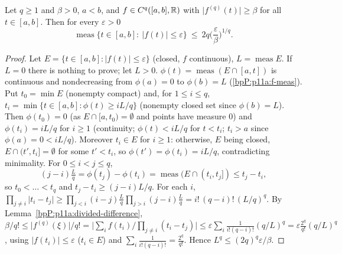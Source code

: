 \begin{lemma}\label{bpP:p11a:scalar-sublevel}
Let $q\ge1$ and $\beta>0$, $a<b$, and $f\in C^q([a,b],\mathbb{R})$ with $\lvert f^{(q)}(t)\rvert\ge\beta$ for all $t\in[a,b]$. Then for every $\varepsilon>0$
\[\operatorname{meas}\{t\in[a,b]:\ \lvert f(t)\rvert\le\varepsilon\}\ \le\ 2q\Big(\frac\varepsilon\beta\Big)^{1/q}.\]
\end{lemma}
\begin{proof}
Let $E=\{t\in[a,b]:\lvert f(t)\rvert\le\varepsilon\}$ (closed, $f$ continuous), $L=\operatorname{meas}E$. If $L=0$ there is nothing to prove; let $L>0$.
\label{stepP:p11a:ss-phi} $\phi(t)=\operatorname{meas}(E\cap[a,t])$ is continuous and nondecreasing from $\phi(a)=0$ to $\phi(b)=L$ (\ref{bpP:p11a:f-meas}).
\label{stepP:p11a:ss-nodes} Put $t_0=\min E$ (nonempty compact) and, for $1\le i\le q$, $t_i=\min\{t\in[a,b]:\phi(t)\ge iL/q\}$ (nonempty closed set since $\phi(b)=L$). Then $\phi(t_0)=0$ (as $E\cap[a,t_0)=\emptyset$ and points have measure $0$) and $\phi(t_i)=iL/q$ for $i\ge1$ (continuity; $\phi(t)<iL/q$ for $t<t_i$; $t_i>a$ since $\phi(a)=0<iL/q$). Moreover $t_i\in E$ for $i\ge1$: otherwise, $E$ being closed, $E\cap(t'\!,t_i]=\emptyset$ for some $t'<t_i$, so $\phi(t')=\phi(t_i)=iL/q$, contradicting minimality. For $0\le i<j\le q$,
\[(j-i)\tfrac Lq=\phi(t_j)-\phi(t_i)=\operatorname{meas}(E\cap(t_i,t_j])\le t_j-t_i,\]
so $t_0<\dots<t_q$ and $t_j-t_i\ge(j-i)L/q$.
\label{stepP:p11a:ss-gaps} For each $i$, $\prod_{j\ne i}\lvert t_i-t_j\rvert\ge\prod_{j<i}(i-j)\frac Lq\prod_{j>i}(j-i)\frac Lq=i!\,(q-i)!\,(L/q)^q$.
\label{stepP:p11a:ss-dd} By Lemma~\ref{bpP:p11a:divided-difference}, $\beta/q!\le\lvert f^{(q)}(\xi)\rvert/q!=\big\lvert\sum_if(t_i)/\prod_{j\ne i}(t_i-t_j)\big\rvert\le\varepsilon\sum_i\frac1{i!(q-i)!}(q/L)^q=\varepsilon\frac{2^q}{q!}(q/L)^q$, using $\lvert f(t_i)\rvert\le\varepsilon$ ($t_i\in E$) and $\sum_i\frac1{i!(q-i)!}=\frac{2^q}{q!}$. Hence $L^q\le(2q)^q\varepsilon/\beta$.
\end{proof}

